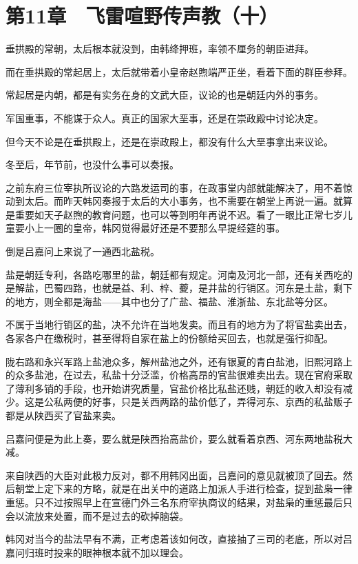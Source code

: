 \section{第11章　飞雷喧野传声教（十）}

垂拱殿的常朝，太后根本就没到，由韩绛押班，率领不厘务的朝臣进拜。

而在垂拱殿的常起居上，太后就带着小皇帝赵煦端严正坐，看着下面的群臣参拜。

常起居是内朝，都是有实务在身的文武大臣，议论的也是朝廷内外的事务。

军国重事，不能谋于众人。真正的国家大垩事，还是在崇政殿中讨论决定。

但今天不论是在垂拱殿上，还是在崇政殿上，都没有什么大垩事拿出来议论。

冬至后，年节前，也没什么事可以奏报。

之前东府三位宰执所议论的六路发运司的事，在政事堂内部就能解决了，用不着惊动到太后。而昨天韩冈奏报于太后的大小事务，也不需要在朝堂上再说一遍。就算是重要如天子赵煦的教育问题，也可以等到明年再说不迟。看了一眼比正常七岁儿童要小上一圈的皇帝，韩冈觉得最好还是不要那么早提经筵的事。

倒是吕嘉问上来说了一通西北盐税。

盐是朝廷专利，各路吃哪里的盐，朝廷都有规定。河南及河北一部，还有关西吃的是解盐，巴蜀四路，也就是益、利、梓、夔，是井盐的行销区。河东是土盐，剩下的地方，则全都是海盐——其中也分了广盐、福盐、淮浙盐、东北盐等分区。

不属于当地行销区的盐，决不允许在当地发卖。而且有的地方为了将官盐卖出去，各家各户在缴税时，甚至得将自家在盐上的份额给买回去，也就是强行抑配。

陇右路和永兴军路上盐池众多，解州盐池之外，还有银夏的青白盐池，旧熙河路上的众多盐池，在过去，私盐十分泛滥，价格高昂的官盐很难卖出去。现在官府采取了薄利多销的手段，也开始讲究质量，官盐价格比私盐还贱，朝廷的收入却没有减少。这是公私两便的好事，只是关西两路的盐价低了，弄得河东、京西的私盐贩子都是从陕西买了官盐来卖。

吕嘉问便是为此上奏，要么就是陕西抬高盐价，要么就看着京西、河东两地盐税大减。

来自陕西的大臣对此极力反对，都不用韩冈出面，吕嘉问的意见就被顶了回去。然后朝堂上定下来的方略，就是在出关中的道路上加派人手进行检查，捉到盐枭一律重惩。只不过按照早上在宣德门外三名东府宰执商议的结果，对盐枭的重惩最后只会以流放来处置，而不是过去的砍掉脑袋。

韩冈对当今的盐法早有不满，正考虑着该如何改，直接抽了三司的老底，所以对吕嘉问归班时投来的眼神根本就不加以理会。

